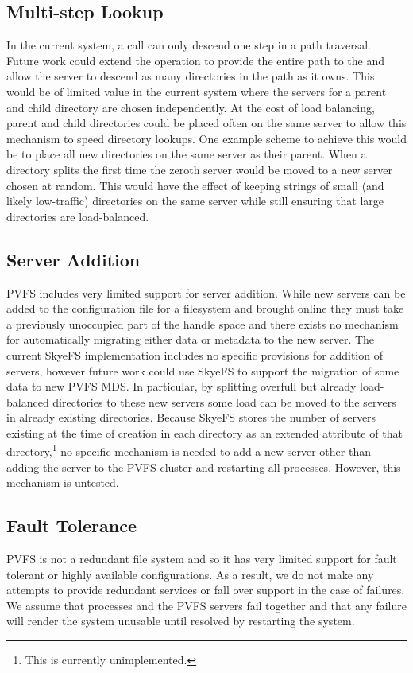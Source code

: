 \documentclass[onecolumn, 11pt, letterpaper]{article}
\begin{document}
\subsection{Multi-step Lookup}
In the current system, a  call can only descend one step in a path
traversal.  Future work could extend the operation to provide the entire path
to the  and allow the server to descend as many
directories in the path as it owns.  This would be of limited value in the
current system where the servers for a parent and child directory are chosen
independently.  At the cost of load balancing, parent and child directories
could be placed often on the same server to allow this mechanism to speed
directory lookups.  One example scheme to achieve this would be to place all
new directories on the same server as their parent.  When a directory splits
the first time the zeroth server would be moved to a new server chosen at
random.  This would have the effect of keeping strings of small (and likely
low-traffic) directories on the same server while still ensuring that large
directories are load-balanced.

\subsection{Server Addition}
PVFS includes very limited support for server addition.  While new servers can
be added to the configuration file for a filesystem and brought online they must
take a previously unoccupied part of the handle space and there exists no
mechanism for automatically migrating either data or metadata to the new server.
The current SkyeFS implementation includes no specific provisions for addition
of servers, however future work could use SkyeFS to support the migration of
some data to new PVFS MDS.  In particular, by splitting overfull but already
load-balanced directories to these new servers some load can be moved to the
servers in already existing directories.  Because SkyeFS stores the number of
servers existing at the time of creation in each directory as an extended
attribute of that directory,\footnote{This is currently unimplemented.} no
specific mechanism is needed to add a new server other than adding the server
to the PVFS cluster and restarting all  processes.  However,
this mechanism is untested.

\subsection{Fault Tolerance}
PVFS is not a redundant file system and so it has very limited support for fault
tolerant or highly available configurations.  As a result, we do not make any
attempts to provide redundant services or fall over support in the case of
failures.  We assume that  processes and the PVFS servers fail
together and that any failure will render the system unusable until resolved by
restarting the system.
\end{document}
